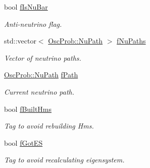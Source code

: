 \begin{DoxyCompactItemize}
bool \hyperlink{classOscProb_1_1PMNS__Base_a0ebaeaefab36a3ff381c6293faedfdd6}{f\+Is\+Nu\+Bar}
\begin{DoxyCompactList}\small\item\em Anti-\/neutrino flag. \end{DoxyCompactList}\item 
std\+::vector$<$ \hyperlink{structOscProb_1_1NuPath}{Osc\+Prob\+::\+Nu\+Path} $>$ \hyperlink{classOscProb_1_1PMNS__Base_a69db9d57e12fc7cbe0431bc6c18fac93}{f\+Nu\+Paths}
\begin{DoxyCompactList}\small\item\em Vector of neutrino paths. \end{DoxyCompactList}\item 
\hyperlink{structOscProb_1_1NuPath}{Osc\+Prob\+::\+Nu\+Path} \hyperlink{classOscProb_1_1PMNS__Base_a849437aa8891fe042e86886ce8f81c6e}{f\+Path}
\begin{DoxyCompactList}\small\item\em Current neutrino path. \end{DoxyCompactList}\item 
bool \hyperlink{classOscProb_1_1PMNS__Base_a9ac3cadeac8db1b90f3152f476244780}{f\+Built\+Hms}
\begin{DoxyCompactList}\small\item\em Tag to avoid rebuilding Hms. \end{DoxyCompactList}\item 
bool \hyperlink{classOscProb_1_1PMNS__Base_a6dc5cd010d2d70b2324745b4e53e9839}{f\+Got\+ES}
\begin{DoxyCompactList}\small\item\em Tag to avoid recalculating eigensystem. \end{DoxyCompactList}\end{DoxyCompactItemize}
